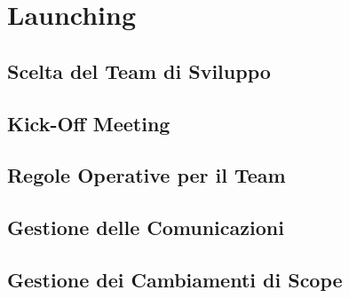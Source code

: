 \chapter{Launching}

\section{Scelta del Team di Sviluppo}

\section{Kick-Off Meeting}

\section{Regole Operative per il Team}

\section{Gestione delle Comunicazioni}

\section{Gestione dei Cambiamenti di Scope}
